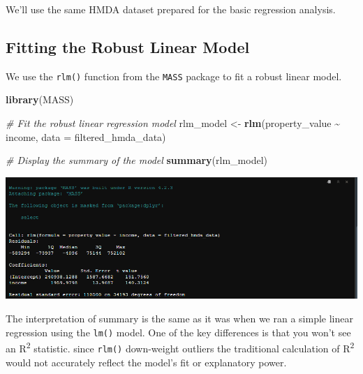 \documentclass[
]{book}
\newenvironment{Shaded}{\begin{snugshade}}{\end{snugshade}}
\newcommand{\AttributeTok}[1]{\textcolor[rgb]{0.13,0.29,0.53}{#1}}
\newcommand{\CommentTok}[1]{\textcolor[rgb]{0.56,0.35,0.01}{\textit{#1}}}
\newcommand{\FunctionTok}[1]{\textcolor[rgb]{0.13,0.29,0.53}{\textbf{#1}}}
\newcommand{\NormalTok}[1]{#1}
\newcommand{\OtherTok}[1]{\textcolor[rgb]{0.56,0.35,0.01}{#1}}
\newcommand{\SpecialCharTok}[1]{\textcolor[rgb]{0.81,0.36,0.00}{\textbf{#1}}}
\begin{document}
We'll use the same HMDA dataset prepared for the basic regression analysis.

\hypertarget{fitting-the-robust-linear-model}{%
\subsection{Fitting the Robust Linear Model}\label{fitting-the-robust-linear-model}}

We use the \texttt{rlm()} function from the \texttt{MASS} package to fit a robust linear model.

\begin{Shaded}
\begin{Highlighting}[]
\FunctionTok{library}\NormalTok{(MASS)}

\CommentTok{\# Fit the robust linear regression model}
\NormalTok{rlm\_model }\OtherTok{\textless{}{-}} \FunctionTok{rlm}\NormalTok{(property\_value }\SpecialCharTok{\textasciitilde{}}\NormalTok{ income, }\AttributeTok{data =}\NormalTok{ filtered\_hmda\_data)}

\CommentTok{\# Display the summary of the model}
\FunctionTok{summary}\NormalTok{(rlm\_model)}
\end{Highlighting}
\end{Shaded}

\includegraphics{images/robust_regression_summary.PNG}

The interpretation of summary is the same as it was when we ran a simple linear regression using the \texttt{lm()} model. One of the key differences is that you won't see an R\textsuperscript{2} statistic. since \texttt{rlm()} down-weight outliers the traditional calculation of R\textsuperscript{2} would not accurately reflect the model's fit or explanatory power.

  
\end{document}
